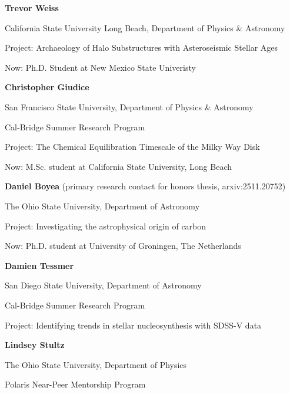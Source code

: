 \documentclass[cv.tex]{subfiles}
\begin{document}
\parbox{0.8\textwidth}{%

	\vspace{1mm}
	\textbf{Trevor Weiss} \par
	California State University Long Beach, Department of Physics \& Astronomy \par
	Project: Archaeology of Halo Substructures with Asteroseismic Stellar Ages \par
	Now: Ph.D. Student at New Mexico State Univeristy \par

	\vspace{1mm}
	\textbf{Christopher Giudice} \par
	San Francisco State University, Department of Physics \& Astronomy \par
	Cal-Bridge Summer Research Program \par
	Project: The Chemical Equilibration Timescale of the Milky Way Disk \par
	Now: M.Sc. student at California State University, Long Beach \par

	\vspace{1mm}
	\textbf{Daniel Boyea} (primary research contact for honors thesis, arxiv:2511.20752) \par
	The Ohio State University, Department of Astronomy \par
	Project: Investigating the astrophysical origin of carbon  \par
	Now: Ph.D. student at University of Groningen, The Netherlands \par

	\vspace{1mm}
	\textbf{Damien Tessmer} \par
	San Diego State University, Department of Astronomy \par
	Cal-Bridge Summer Research Program \par
	Project: Identifying trends in stellar nucleosynthesis with SDSS-V data \par

	\vspace{1mm}
	\textbf{Lindsey Stultz} \par
	The Ohio State University, Department of Physics \par
	Polaris Near-Peer Mentorship Program \par

}
\end{document}
